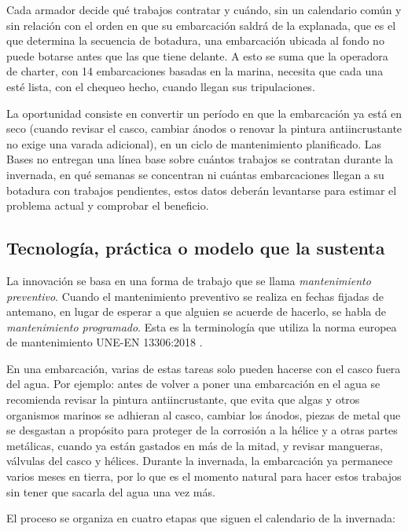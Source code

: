Cada armador decide qué trabajos contratar y cuándo, sin un calendario común y sin relación con el orden en que su embarcación saldrá de la explanada, que es el que determina la  secuencia de botadura, una embarcación ubicada al fondo no puede botarse antes que las que tiene delante. A esto se suma que la operadora de charter, con 14 embarcaciones basadas en la marina, necesita que cada una esté lista, con el chequeo hecho, cuando llegan sus tripulaciones.

La oportunidad consiste en convertir un período en que la embarcación ya está en seco (cuando revisar el casco, cambiar ánodos o renovar la pintura
antiincrustante no exige una varada adicional), en un ciclo de mantenimiento
planificado. Las Bases no entregan una línea base sobre cuántos trabajos se
contratan durante la invernada, en qué semanas se concentran ni cuántas
embarcaciones llegan a su botadura con trabajos pendientes, estos datos deberán
levantarse para estimar el problema actual y comprobar el beneficio.

\subsection{Tecnología, práctica o modelo que la sustenta}

La innovación se basa en una forma de trabajo que se llama \emph{mantenimiento preventivo}. Cuando el mantenimiento preventivo se realiza en fechas fijadas de antemano, en lugar de esperar a que alguien se acuerde de hacerlo, se habla de \emph{mantenimiento programado}. Esta es la terminología que utiliza la norma europea de mantenimiento UNE-EN 13306:2018 \parencite{une13306}.

En una embarcación, varias de estas tareas solo pueden hacerse con el casco
fuera del agua. Por ejemplo: antes de volver a poner una embarcación en el agua
se recomienda revisar la pintura antiincrustante, que evita que algas y otros
organismos marinos se adhieran al casco, cambiar los ánodos, piezas de metal
que se desgastan a propósito para proteger de la corrosión a la hélice y a
otras partes metálicas, cuando ya están gastados en más de la mitad, y revisar
mangueras, válvulas del casco y hélices. Durante la
invernada, la embarcación ya permanece varios meses en tierra, por lo que es el
momento natural para hacer estos trabajos sin tener que sacarla del agua una
vez más.

El proceso se organiza en cuatro etapas que siguen el calendario de la
invernada:

